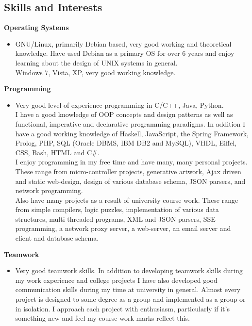 \documentclass{res}
\begin{document}
\begin{resume}
\section{Skills and Interests} 
\vspace{0.1in}
 {\bf Operating Systems}
    \begin{itemize} %
      \item[] GNU/Linux, primarily Debian based, very good working and theoretical knowledge. Have used Debian as a primary OS for over 6 years and enjoy learning about the design of UNIX systems in general.\\
        Windows 7, Vista, XP, very good working knowledge.
      \end{itemize}
{\bf Programming} 
       \begin{itemize}
        \item[] Very good level of experience programming in C/C++, Java, Python.\\
        I have a good knowledge of OOP concepts and design patterns as well as functional, imperative and declarative programming paradigms.  
        In addition I have a good working knowledge of Haskell, JavaScript, the Spring Framework, Prolog, PHP, SQL (Oracle DBMS, IBM DB2 and MySQL), VHDL, Eiffel, CSS, Bash, HTML and C\#.\\
        I enjoy programming in my free time and have many, many personal projects. These range from micro-controller projects, generative artwork, Ajax driven and static web-design, design of various database schema, JSON parsers, and network programming.\\
        Also have many projects as a result of university course work. These range from simple compilers, logic puzzles, implementation of various data structures, multi-threaded programs, XML and JSON parsers, SSE programming, a network proxy server, a web-server, an email server and client and database schema.
    \end{itemize}

    {\bf  Teamwork} 
        \begin{itemize}
        \item[]  Very good teamwork skills. In addition to developing teamwork skills during my work experience and college projects I have also developed good communication skills during my time at university in general. Almost every project is designed to some degree as a group and implemented as a group or in isolation. I approach each project with enthusiasm, particularly if it's something new and feel my course work marks reflect this.
       \end{itemize} 


\end{resume}
\end{document}
